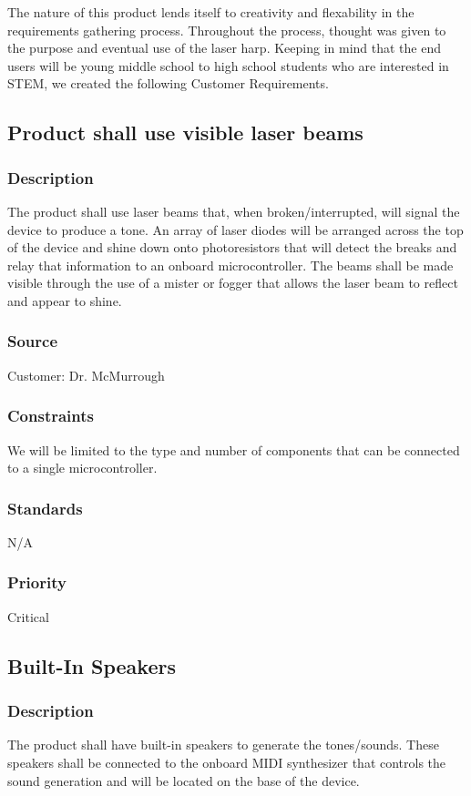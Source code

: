 The nature of this product lends itself to creativity and flexability in the requirements gathering process. Throughout the process, thought was given to the purpose and eventual use of the laser harp. Keeping in mind that the end users will be young middle school to high school students who are interested in STEM, we created the following Customer Requirements.   
\subsection{Product shall use visible laser beams}
\subsubsection{Description}
The product shall use laser beams that, when broken/interrupted, will signal the device to produce a tone. An array of laser diodes will be arranged across the top of the device and shine down onto photoresistors that will detect the breaks and relay that information to an onboard microcontroller. The beams shall be made visible through the use of a mister or fogger that allows the laser beam to reflect and appear to shine.
\subsubsection{Source}
Customer: Dr. McMurrough
\subsubsection{Constraints}
We will be limited to the type and number of components that can be connected to a single microcontroller. 
\subsubsection{Standards}
N/A
\subsubsection{Priority}
Critical

\subsection{Built-In Speakers}
\subsubsection{Description}
The product shall have built-in speakers to generate the tones/sounds. These speakers shall be connected to the onboard MIDI synthesizer that controls the sound generation and will be located on the base of the device.
